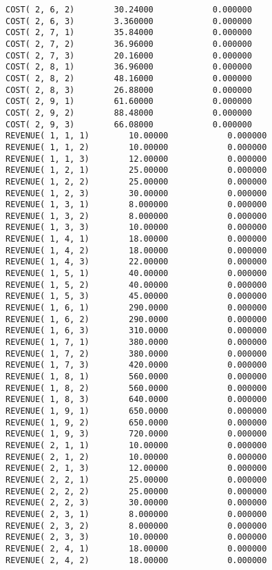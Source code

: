 \documentclass[12pt]{article}
\begin{document}
\begin{appendices}
\begin{lstlisting}
COST( 2, 6, 2)        30.24000            0.000000
COST( 2, 6, 3)        3.360000            0.000000
COST( 2, 7, 1)        35.84000            0.000000
COST( 2, 7, 2)        36.96000            0.000000
COST( 2, 7, 3)        20.16000            0.000000
COST( 2, 8, 1)        36.96000            0.000000
COST( 2, 8, 2)        48.16000            0.000000
COST( 2, 8, 3)        26.88000            0.000000
COST( 2, 9, 1)        61.60000            0.000000
COST( 2, 9, 2)        88.48000            0.000000
COST( 2, 9, 3)        66.08000            0.000000
REVENUE( 1, 1, 1)        10.00000            0.000000
REVENUE( 1, 1, 2)        10.00000            0.000000
REVENUE( 1, 1, 3)        12.00000            0.000000
REVENUE( 1, 2, 1)        25.00000            0.000000
REVENUE( 1, 2, 2)        25.00000            0.000000
REVENUE( 1, 2, 3)        30.00000            0.000000
REVENUE( 1, 3, 1)        8.000000            0.000000
REVENUE( 1, 3, 2)        8.000000            0.000000
REVENUE( 1, 3, 3)        10.00000            0.000000
REVENUE( 1, 4, 1)        18.00000            0.000000
REVENUE( 1, 4, 2)        18.00000            0.000000
REVENUE( 1, 4, 3)        22.00000            0.000000
REVENUE( 1, 5, 1)        40.00000            0.000000
REVENUE( 1, 5, 2)        40.00000            0.000000
REVENUE( 1, 5, 3)        45.00000            0.000000
REVENUE( 1, 6, 1)        290.0000            0.000000
REVENUE( 1, 6, 2)        290.0000            0.000000
REVENUE( 1, 6, 3)        310.0000            0.000000
REVENUE( 1, 7, 1)        380.0000            0.000000
REVENUE( 1, 7, 2)        380.0000            0.000000
REVENUE( 1, 7, 3)        420.0000            0.000000
REVENUE( 1, 8, 1)        560.0000            0.000000
REVENUE( 1, 8, 2)        560.0000            0.000000
REVENUE( 1, 8, 3)        640.0000            0.000000
REVENUE( 1, 9, 1)        650.0000            0.000000
REVENUE( 1, 9, 2)        650.0000            0.000000
REVENUE( 1, 9, 3)        720.0000            0.000000
REVENUE( 2, 1, 1)        10.00000            0.000000
REVENUE( 2, 1, 2)        10.00000            0.000000
REVENUE( 2, 1, 3)        12.00000            0.000000
REVENUE( 2, 2, 1)        25.00000            0.000000
REVENUE( 2, 2, 2)        25.00000            0.000000
REVENUE( 2, 2, 3)        30.00000            0.000000
REVENUE( 2, 3, 1)        8.000000            0.000000
REVENUE( 2, 3, 2)        8.000000            0.000000
REVENUE( 2, 3, 3)        10.00000            0.000000
REVENUE( 2, 4, 1)        18.00000            0.000000
REVENUE( 2, 4, 2)        18.00000            0.000000

\end{lstlisting}
\end{appendices}
\end{document}
